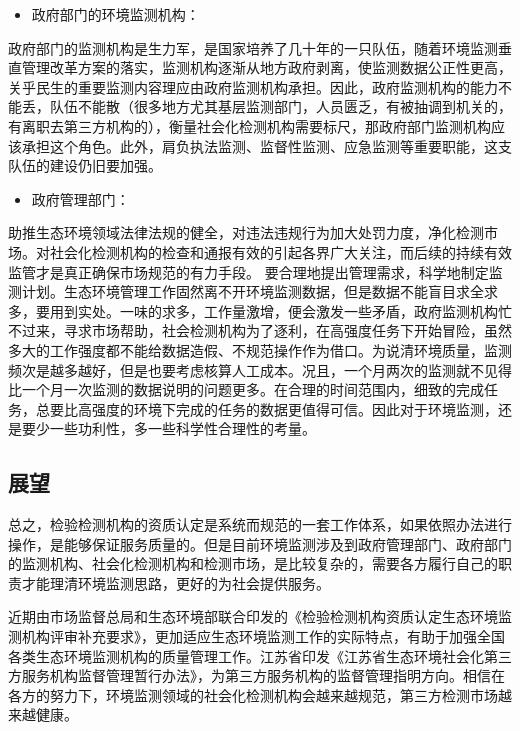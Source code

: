 \documentclass[
]{book}
\providecommand{\tightlist}{%
  \setlength{\itemsep}{0pt}\setlength{\parskip}{0pt}}
\begin{document}
\begin{itemize}
\tightlist
\item
  政府部门的环境监测机构：
\end{itemize}

政府部门的监测机构是生力军，是国家培养了几十年的一只队伍，随着环境监测垂直管理改革方案的落实，监测机构逐渐从地方政府剥离，使监测数据公正性更高，关乎民生的重要监测内容理应由政府监测机构承担。因此，政府监测机构的能力不能丢，队伍不能散（很多地方尤其基层监测部门，人员匮乏，有被抽调到机关的，有离职去第三方机构的），衡量社会化检测机构需要标尺，那政府部门监测机构应该承担这个角色。此外，肩负执法监测、监督性监测、应急监测等重要职能，这支队伍的建设仍旧要加强。

\begin{itemize}
\tightlist
\item
  政府管理部门：
\end{itemize}

助推生态环境领域法律法规的健全，对违法违规行为加大处罚力度，净化检测市场。对社会化检测机构的检查和通报有效的引起各界广大关注，而后续的持续有效监管才是真正确保市场规范的有力手段。
要合理地提出管理需求，科学地制定监测计划。生态环境管理工作固然离不开环境监测数据，但是数据不能盲目求全求多，要用到实处。一味的求多，工作量激增，便会激发一些矛盾，政府监测机构忙不过来，寻求市场帮助，社会检测机构为了逐利，在高强度任务下开始冒险，虽然多大的工作强度都不能给数据造假、不规范操作作为借口。为说清环境质量，监测频次是越多越好，但是也要考虑核算人工成本。况且，一个月两次的监测就不见得比一个月一次监测的数据说明的问题更多。在合理的时间范围内，细致的完成任务，总要比高强度的环境下完成的任务的数据更值得可信。因此对于环境监测，还是要少一些功利性，多一些科学性合理性的考量。

\hypertarget{ux5c55ux671b}{%
\subsection{展望}\label{ux5c55ux671b}}

总之，检验检测机构的资质认定是系统而规范的一套工作体系，如果依照办法进行操作，是能够保证服务质量的。但是目前环境监测涉及到政府管理部门、政府部门的监测机构、社会化检测机构和检测市场，是比较复杂的，需要各方履行自己的职责才能理清环境监测思路，更好的为社会提供服务。

近期由市场监督总局和生态环境部联合印发的《检验检测机构资质认定生态环境监测机构评审补充要求》，更加适应生态环境监测工作的实际特点，有助于加强全国各类生态环境监测机构的质量管理工作。江苏省印发《江苏省生态环境社会化第三方服务机构监督管理暂行办法》，为第三方服务机构的监督管理指明方向。相信在各方的努力下，环境监测领域的社会化检测机构会越来越规范，第三方检测市场越来越健康。
\end{document}
